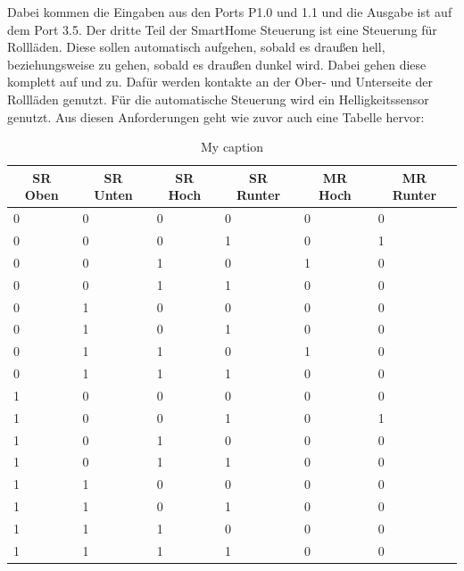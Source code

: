 Dabei kommen die Eingaben aus den Ports P1.0 und 1.1 und die Ausgabe ist auf dem Port 3.5.
Der dritte Teil der SmartHome Steuerung ist eine Steuerung für Rollläden. Diese sollen automatisch aufgehen, sobald es draußen hell, beziehungsweise zu gehen, sobald es draußen dunkel wird. Dabei gehen diese komplett auf und zu. Dafür werden kontakte an der Ober- und Unterseite der Rollläden genutzt. Für die automatische Steuerung wird ein Helligkeitssensor genutzt.
Aus diesen Anforderungen geht wie zuvor auch eine Tabelle hervor:

\begin{table}[]
\centering
\caption{My caption}
\label{my-label}
\begin{tabular}{|l|l|l|l|l|l|}
\hline
\multicolumn{1}{|c|}{\textbf{SR Oben}} & \multicolumn{1}{c|}{\textbf{SR Unten}} & \multicolumn{1}{c|}{\textbf{SR Hoch}} & \multicolumn{1}{c|}{\textbf{SR Runter}} & \multicolumn{1}{c|}{\textbf{MR Hoch}} & \multicolumn{1}{c|}{\textbf{MR Runter}} \\ \hline
 0 & 0 & 0 & 0 & 0 & 0 \\ \hline
 0 & 0 & 0 & 1 & 0 & 1 \\ \hline
 0 & 0 & 1 & 0 & 1 & 0 \\ \hline
 0 & 0 & 1 & 1 & 0 & 0 \\ \hline
 0 & 1 & 0 & 0 & 0 & 0 \\ \hline
 0 & 1 & 0 & 1 & 0 & 0 \\ \hline
 0 & 1 & 1 & 0 & 1 & 0 \\ \hline
 0 & 1 & 1 & 1 & 0 & 0 \\ \hline
 1 & 0 & 0 & 0 & 0 & 0 \\ \hline
 1 & 0 & 0 & 1 & 0 & 1 \\ \hline
 1 & 0 & 1 & 0 & 0 & 0 \\ \hline
 1 & 0 & 1 & 1 & 0 & 0 \\ \hline
 1 & 1 & 0 & 0 & 0 & 0 \\ \hline
 1 & 1 & 0 & 1 & 0 & 0 \\ \hline
 1 & 1 & 1 & 0 & 0 & 0 \\ \hline
 1 & 1 & 1 & 1 & 0 & 0 \\ \hline
\end{tabular}
\end{table}

